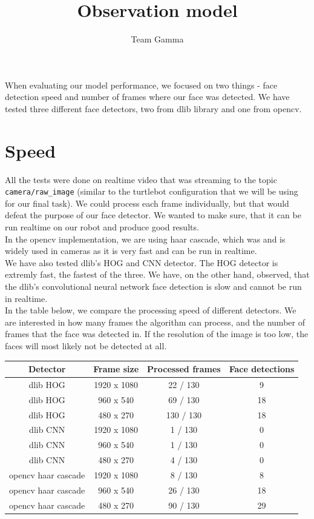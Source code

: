 \documentclass[12pt,a4paper]{article}
\author{Team Gamma}
\title{Observation model}
\date{}
\begin{document}
	
	\maketitle
	
	When evaluating our model performance, we focused on two things - face detection speed and number of frames where our face was detected. We have tested three different face detectors, two from dlib library and one from opencv.
	
	\section{Speed}
	
	All the tests were done on realtime video that was streaming to the topic \texttt{camera/raw\_image} (similar to the turtlebot configuration that we will be using for our final task). We could process each frame individually, but that would defeat the purpose of our face detector. We wanted to make sure, that it can be run realtime on our robot and produce good results. \\
	
	In the opencv implementation, we are using haar cascade, which was and is widely used in cameras as it is very fast and can be run in realtime. \\
	
	We have also tested dlib's HOG and CNN detector. The HOG detector is extremly fast, the fastest of the three. We have, on the other hand, observed, that the dlib's convolutional neural network face detection is slow and cannot be run in realtime. \\
	
	In the table below, we compare the processing speed of different detectors. We are interested in how many frames the algorithm can process, and the number of frames that the face was detected in. If the resolution of the image is too low, the faces will most likely not be detected at all. \\
	
	\begin{center}
		\begin{tabular}{|c|c|c|c|}
			\hline 
			Detector & Frame size & Processed frames & Face detections \\ 
			\hline
			dlib HOG & 1920 x 1080 & 22 / 130 & 9 \\
			dlib HOG & 960 x 540 & 69 / 130 & 18 \\
			dlib HOG & 480 x 270 & 130 / 130 & 18 \\
			dlib CNN & 1920 x 1080 & 1 / 130 & 0 \\
			dlib CNN & 960 x 540 & 1 / 130 & 0 \\
			dlib CNN & 480 x 270 & 4 / 130 & 0 \\
			opencv haar cascade & 1920 x 1080 & 8 / 130 & 8 \\
			opencv haar cascade & 960 x 540 & 26 / 130 & 18 \\
			opencv haar cascade & 480 x 270 & 90 / 130 & 29 \\
			\hline 
		\end{tabular} \\
	\end{center}
	
\end{document}
